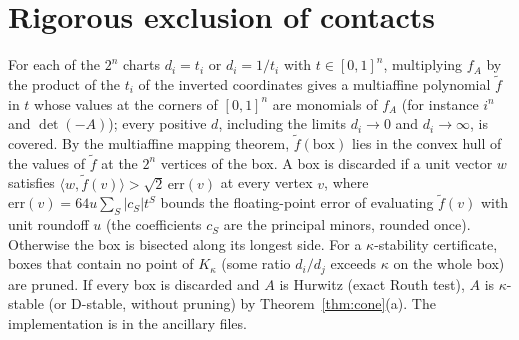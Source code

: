 \documentclass[11pt,a4paper]{article}
\theoremstyle{plain}
\theoremstyle{definition}
\newcommand{\Kk}{K_\kappa}
\begin{document}
\appendix
\section{Rigorous exclusion of contacts}\label{app:exclusion}

For each of the $2^n$ charts $d_i=t_i$ or $d_i=1/t_i$ with $t\in[0,1]^n$, multiplying $f_A$ by the product of the
$t_i$ of the inverted coordinates gives a multiaffine polynomial $\tilde f$ in $t$ whose values at the corners of
$[0,1]^n$ are monomials of $f_A$ (for instance $i^n$ and $\det(-A)$); every positive $d$, including the limits
$d_i\to0$ and $d_i\to\infty$, is covered. By the multiaffine mapping theorem, $\tilde f(\text{box})$ lies in the convex
hull of the values of $\tilde f$ at the $2^n$ vertices of the box. A box is discarded if a unit vector $w$ satisfies
$\langle w,\tilde f(v)\rangle>\sqrt2\,\mathrm{err}(v)$ at every vertex $v$, where $\mathrm{err}(v)=64u\sum_S|c_S|t^S$
bounds the floating-point error of evaluating $\tilde f(v)$ with unit roundoff $u$ (the coefficients $c_S$ are the
principal minors, rounded once). Otherwise the box is bisected along its longest side. For a $\kappa$-stability
certificate, boxes that contain no point of $\Kk$ (some ratio $d_i/d_j$ exceeds $\kappa$ on the whole box) are pruned.
If every box is discarded and $A$ is Hurwitz (exact Routh test), $A$ is $\kappa$-stable (or D-stable, without pruning)
by Theorem~\ref{thm:cone}(a). The implementation is in the ancillary files.



\end{document}
